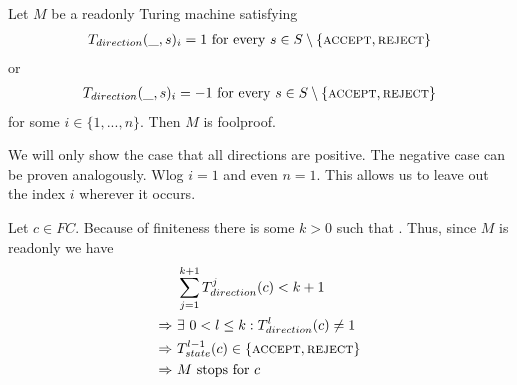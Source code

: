 \begin{Lemma} \label{turing_machines:lemma_foolproofness:lemma}
	Let $M$ be a readonly Turing machine satisfying
	\begin{align*}
		T_{direction} (\_,s)_i = 1~\text{for every}~ s \in S \setminus \{\text{\scshape{accept}},\text{\scshape{reject}}\}
	\end{align*}
	or
	\begin{align*}
		T_{direction} (\_,s)_i = -1~\text{for every}~ s \in S \setminus \{\text{\scshape{accept}},\text{\scshape{reject}}\}
	\end{align*}
	for some $i \in \{1,...,n\}$.
	Then $M$ is foolproof.
\end{Lemma}
\proof
We will only show the case that all directions are positive. The negative case can be proven analogously.
Wlog $i=1$ and even $n=1$. This allows us to leave out the index $i$ wherever it occurs.

Let $c \in FC$. Because of finiteness there is some $k > 0$ such that .
Thus, since $M$ is readonly we have
\begin{align*}
	&\sum_{j=1}^{k+1} T_{direction}^j (c) < k+1 \\
	\Rightarrow~&\exists~0 < l \leq k: T_{direction}^l (c) \neq 1 \\
	\Rightarrow~&T_{state}^{l-1} (c) \in \{\text{\scshape{accept}},\text{\scshape{reject}}\} \\
	\Rightarrow~&M ~\text{stops for}~ c
\end{align*}
\endproof
